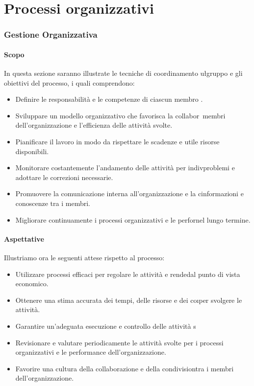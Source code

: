 \chapter{Processi organizzativi}


\subsection{Gestione Organizzativa}

\subsubsection{Scopo}

In questa sezione saranno illustrate le tecniche di coordinamento u\l gruppo e gli obiettivi del processo, i quali comprendono:

\begin{itemize}
\item Definire le responsabilità e le competenze di ciascun membro \zazione.
\item Sviluppare un modello organizzativo che favorisca la collabor\ membri dell'organizzazione e l'efficienza delle attività svolte.
\item Pianificare il lavoro in modo da rispettare le scadenze e uti\eglio le risorse disponibili.
\item Monitorare costantemente l'andamento delle attività per indiv\uali problemi e adottare le correzioni necessarie.
\item Promuovere la comunicazione interna all'organizzazione e la c\di informazioni e conoscenze tra i membri.
\item Migliorare continuamente i processi organizzativi e le perfor\rganizzazione nel lungo termine.
\end{itemize}

\subsubsection{Aspettative}

Illustriamo ora le seguenti attese rispetto al processo:

\begin{itemize}
\item Utilizzare processi efficaci per regolare le attività e rende\cienti dal punto di vista economico.
\item Ottenere una stima accurata dei tempi, delle risorse e dei co\i per svolgere le attività.
\item Garantire un'adeguata esecuzione e controllo delle attività s\
\item Revisionare e valutare periodicamente le attività svolte per \ontinuamente i processi organizzativi e le performance dell'organizzazione.
\item Favorire una cultura della collaborazione e della condivision\scenze tra i membri dell'organizzazione.
\end{itemize}

